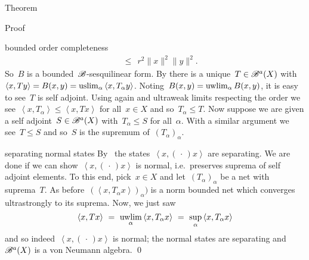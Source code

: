 \documentclass[b]{subfiles}
\begin{document}
\begin{parsec}
\begin{point}{Theorem}
\begin{point}{Proof}
\begin{point}{bounded order completeness}
\begin{align*}
    &\ \ \leq \ \  r^2 \|x\|^2 \|y\|^2.
\end{align*}
So~$B$ is a bounded~$\mathscr{B}$-sesquilinear form.
By 
    there is a unique~$T \in \mathscr{B}^a(X)$
    with~$\left<x,Ty\right> = B(x,y) = \uslim_\alpha \left<x,T_\alpha y\right>$.
Noting~$B(x,y) = \uwlim_\alpha B(x,y)$,
    it is easy to see~$T$ is self adjoint.
Using  again and ultraweak limits respecting the order
    we see~$\left<x,T_\alpha\right> \leq \left<x,T x\right>$
    for all~$x \in X$ and so~$T_\alpha \leq T$.
Now suppose we are given a self adjoint~$S \in \mathscr{B}^a(X)$
    with~$T_\alpha \leq S$ for all~$\alpha$.
With a similar argument we see~$T \leq S$ and so~$S$ is
    the supremum of~$(T_\alpha)_\alpha$.
\end{point}
\begin{point}{separating normal states}%
By~
    the states~$\left<x,(\,\cdot\,)x\right>$
    are separating.
We are done if we can show~$\left<x,(\,\cdot\,)x\right>$
    is normal, i.e.~preserves suprema of self adjoint elements.
To this end, pick~$x \in X$ and let~$(T_\alpha)_\alpha$
    be a net with suprema~$T$.
As before~$(\left<x,T_\alpha x\right>)_\alpha)$
    is a norm bounded net which converges ultrastrongly to its
    suprema.
Now, we just saw
\begin{equation*}
    \left<x,Tx\right> \ =\  \uwlim_\alpha \left<x, T_\alpha x\right>
               \  =\  \sup_\alpha \left<x, T_\alpha x\right>
\end{equation*}
and so indeed~$\left<x, (\,\cdot\,)x\right>$ is normal;
the normal states are separating
and~$\mathscr{B}^a(X)$ is a von Neumann algebra. \qed
\end{point}
\end{point}
\end{point}
\end{parsec}
\end{document}
